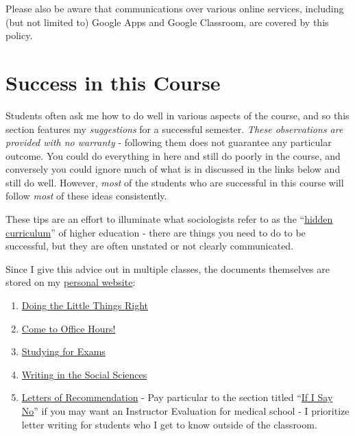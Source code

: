 \documentclass[]{book}
\providecommand{\tightlist}{%
  \setlength{\itemsep}{0pt}\setlength{\parskip}{0pt}}
\begin{document}
Please also be aware that communications over various online services, including (but not limited to) Google Apps and Google Classroom, are covered by this policy.

\hypertarget{success-in-this-course}{%
\chapter{Success in this Course}\label{success-in-this-course}}

Students often ask me how to do well in various aspects of the course, and so this section features my \emph{suggestions} for a successful semester. \emph{These observations are provided with no warranty} - following them does not guarantee any particular outcome. You could do everything in here and still do poorly in the course, and conversely you could ignore much of what is in discussed in the links below and still do well. However, \emph{most} of the students who are successful in this course will follow \emph{most} of these ideas consistently.

These tips are an effort to illuminate what sociologists refer to as the ``\href{https://books.google.com/books?hl=en\&lr=\&id=5r-TAgAAQBAJ\&oi=fnd\&pg=PP1\&dq=hidden+curriculum\#v=onepage\&q=hidden\%20curriculum\&f=false}{hidden curriculum}'' of higher education - there are things you need to do to be successful, but they are often unstated or not clearly communicated.

Since I give this advice out in multiple classes, the documents themselves are stored on my \href{https://chris-prener.github.io}{personal website}:

\begin{enumerate}
\def\labelenumi{\arabic{enumi}.}
\tightlist
\item
  \href{https://chris-prener.github.io/resources/students/little-things/}{Doing the Little Things Right}
\item
  \href{https://chris-prener.github.io/resources/students/office-hours/}{Come to Office Hours!}
\item
  \href{https://chris-prener.github.io/resources/students/exams/}{Studying for Exams}
\item
  \href{https://chris-prener.github.io/resources/students/writing/}{Writing in the Social Sciences}
\item
  \href{https://chris-prener.github.io/resources/students/exams/}{Letters of Recommendation} - Pay particular to the section titled ``\href{https://chris-prener.github.io/resources/students/letters/\#if-i-say-no}{If I Say No}'' if you may want an Instructor Evaluation for medical school - I prioritize letter writing for students who I get to know outside of the classroom.
\end{enumerate}
\end{document}
